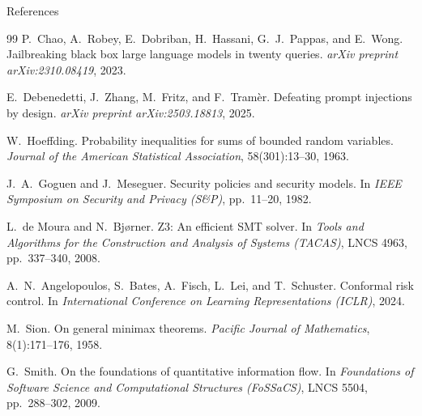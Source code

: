\documentclass[aspectratio=169,11pt]{beamer}
\begin{document}
\begin{frame}[allowframebreaks]{References}
\begin{thebibliography}{99}
      P.~Chao, A.~Robey, E.~Dobriban, H.~Hassani, G.~J.~Pappas, and E.~Wong.
      \newblock Jailbreaking black box large language models in twenty queries.
      \newblock \emph{arXiv preprint arXiv:2310.08419}, 2023.

      E.~Debenedetti, J.~Zhang, M.~Fritz, and F.~Tram{\`e}r.
      \newblock Defeating prompt injections by design.
      \newblock \emph{arXiv preprint arXiv:2503.18813}, 2025.

      W.~Hoeffding.
      \newblock Probability inequalities for sums of bounded random variables.
      \newblock \emph{Journal of the American Statistical Association}, 58(301):13--30, 1963.

      J.~A.~Goguen and J.~Meseguer.
      \newblock Security policies and security models.
      \newblock In \emph{IEEE Symposium on Security and Privacy (S\&P)}, pp.~11--20, 1982.

      L.~de Moura and N.~Bj{\o}rner.
      \newblock Z3: An efficient SMT solver.
      \newblock In \emph{Tools and Algorithms for the Construction and Analysis of Systems (TACAS)}, LNCS 4963, pp.~337--340, 2008.

      A.~N.~Angelopoulos, S.~Bates, A.~Fisch, L.~Lei, and T.~Schuster.
      \newblock Conformal risk control.
      \newblock In \emph{International Conference on Learning Representations (ICLR)}, 2024.

      M.~Sion.
      \newblock On general minimax theorems.
      \newblock \emph{Pacific Journal of Mathematics}, 8(1):171--176, 1958.

      G.~Smith.
      \newblock On the foundations of quantitative information flow.
      \newblock In \emph{Foundations of Software Science and Computational Structures (FoSSaCS)}, LNCS 5504, pp.~288--302, 2009.
  \end{thebibliography}
\end{frame}
\end{document}
